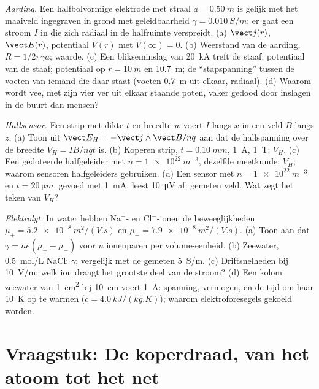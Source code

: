 \begin{exercise}[$\star\star\star$]\label{exo:b2:charges-currents-conduction:10}
\emph{Aarding.} Een halfbolvormige elektrode met straal $a = \qty{0.50}{m}$
is gelijk met het maaiveld ingegraven in grond met geleidbaarheid
$\gamma =
\qty{0.010}{S/m}$; er gaat een stroom $I$ in die zich radiaal in
de halfruimte verspreidt. (a) $\vect j(r)$, $\vect E(r)$, potentiaal $V(r)$
met $V(\infty) = 0$. (b) Weerstand van de aarding, $R = 1/2\pi\gamma a$;
waarde. (c) Een blikseminslag van \qty{20}{kA} treft de staaf: potentiaal
van de staaf; potentiaal op $r = \qty{10}{m}$ en \qty{10.7}{m}; de
``stapspanning'' tussen de voeten van iemand die daar staat (voeten
\qty{0.7}{m} uit elkaar, radiaal). (d) Waarom wordt vee, met zijn vier ver
uit elkaar staande poten, vaker gedood door inslagen in de buurt dan mensen?
\end{exercise}

\begin{exercise}[$\star\star\star$]\label{exo:b2:charges-currents-conduction:11}
\emph{Hallsensor.} Een strip met dikte $t$ en breedte $w$ voert $I$ langs
$x$ in een veld $B$ langs $z$. (a) Toon uit
$\vect E_H = -\vect j\wedge\vect B
/nq$ aan dat de hallspanning over de
breedte $V_H = IB/nqt$ is. (b) Koperen strip, $t = \qty{0.10}{mm}$,
\qty{1}{A}, \qty{1}{T}: $V_H$. (c) Een gedoteerde halfgeleider met
$n = \qty{1e22}{m^{-3}}$, dezelfde meetkunde: $V_H$; waarom sensoren
halfgeleiders gebruiken. (d) Een sensor met $n = \qty{1e22}{m^{-3}}$ en
$t =
\qty{20}{\micro m}$, gevoed met \qty{1}{mA}, leest \qty{10}{\micro V}
af: gemeten veld. Wat zegt het teken van $V_H$?
\end{exercise}

\begin{exercise}[$\star\star\star$]\label{exo:b2:charges-currents-conduction:12}
\emph{Elektrolyt.} In water hebben Na$^+$- en Cl$^-$-ionen de
beweeglijkheden $\mu_+ = \qty{5.2e-8}{m^2/(V.s)}$ en
$\mu_- = \qty{7.9e-8}{m^2/(V.s)}$. (a) Toon aan dat
$\gamma = ne(\mu_+ + \mu_-)$ voor $n$ ionenparen per volume-eenheid. (b)
Zeewater, \qty{0.5}{mol/L} NaCl: $\gamma$; vergelijk met de gemeten
\qty{5}{S/m}. (c) Driftsnelheden bij \qty{10}{V/m}; welk ion draagt het
grootste deel van de stroom? (d) Een kolom zeewater van \qty{1}{cm^2} bij
\qty{10}{cm} voert \qty{1}{A}: spanning, vermogen, en de tijd om haar
\qty{10}{K} op te warmen ($c =
\qty{4.0}{kJ/(kg.K)}$); waarom
elektroforesegels gekoeld worden.
\end{exercise}

\section{Vraagstuk: De koperdraad, van het atoom tot het net}

